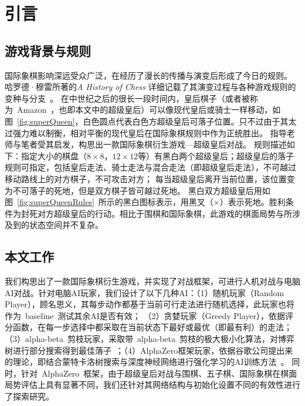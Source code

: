 \chapter{引言}
\label{chap:introduction}

\section{游戏背景与规则}
国际象棋影响深远受众广泛，在经历了漫长的传播与演变后形成了今日的规则。
哈罗德·穆雷所著的\textit{A History of Chess} 详细记载了其演变过程与各种游戏规则的变种与分支~\cite{murray2015history}。
在中世纪之后的很长一段时间内，皇后棋子（或者被称为~Amazon~，也即本文中的超级皇后）可以像现代皇后或骑士一样移动，如图~\ref{fig:superQueen}，白色圆点代表白色方超级皇后可落子位置。只不过由于其太过强力难以制衡，相对平衡的现代皇后在国际象棋规则中作为正统胜出。
指导老师与笔者受其启发，构思出一款国际象棋衍生游戏—超级皇后对战。
规则描述如下：指定大小的棋盘（$8\times8$，$12\times12$等）有黑白两个超级皇后；超级皇后的落子规则可指定，包括皇后走法、骑士走法与混合走法（即超级皇后走法），不可越过移动路线上的对方棋子，不可攻击对方；
每当超级皇后离开当前位置，该位置变为不可落子的死地，但是双方棋子皆可越过死地。
黑白双方超级皇后用如图~\ref{fig:superQueenRules}~所示的黑白图标表示，用黑叉（$\mathbf{\times}$）表示死地。胜利条件为封死对方超级皇后的行动。相比于围棋和国际象棋，此游戏的棋面局势与所涉及到的状态空间并不复杂。



\section{本文工作}
我们构思出了一款国际象棋衍生游戏，并实现了对战框架，可进行人机对战与电脑AI对战。针对电脑AI玩家，我们设计了以下几种AI：（1）随机玩家（Random Player），顾名思义，其每步动作都基于当前可行走法进行随机选择，此玩家也将作为~baseline~测试其余AI是否有效；
（2）贪婪玩家（Greedy Player），依据评分函数，在每一步选择中都采取在当前状态下最好或最优（即最有利）的走法；（3）alpha-beta~剪枝玩家，采取带~alpha-beta~剪枝的极大极小化算法，对博弈树进行部分搜索得到最佳落子~\cite{russell2010artificial}；（4）AlphaZero框架玩家，依据谷歌公司提出来的理论，即结合蒙特卡洛树搜索与深度神经网络进行强化学习的AI训练方法~\cite{Silver1140}。
同时，针对~AlphaZero~框架，由于超级皇后对战与围棋、五子棋、国际象棋在棋面局势评估上具有显著不同，我们还针对其网络结构与初始化设置不同的有效性进行了探索研究。

